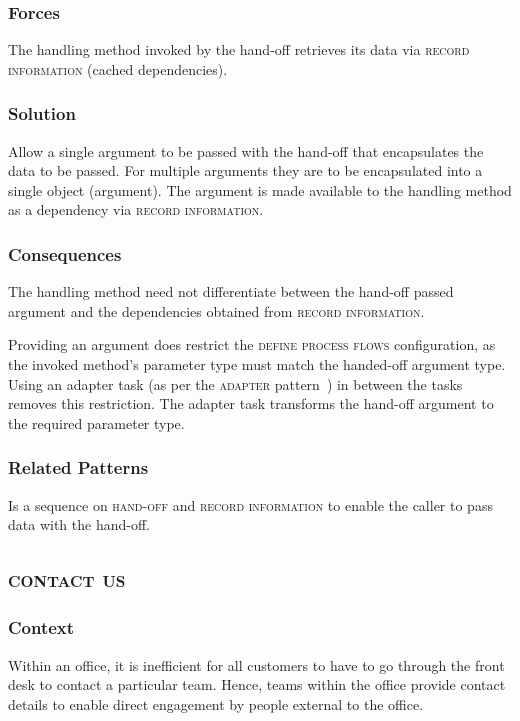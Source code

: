 \documentclass[prodmode]{style/acmlarge}
\begin{document}
\subsubsection*{Forces} The handling method invoked by the hand-off retrieves
its data via \textsc{record information} (cached dependencies).

\subsubsection*{\textbf{Solution}} Allow a single argument to be passed with the
hand-off that encapsulates the data to be passed.  For multiple arguments they
are to be encapsulated into a single object (argument).  The argument is made
available to the handling method as a dependency via \textsc{record
information}.

\subsubsection*{Consequences} The handling method need not differentiate between
the hand-off passed argument and the dependencies obtained from \textsc{record
information}.

Providing an argument does restrict the \textsc{define process flows}
configuration, as the invoked method's parameter type must match the handed-off
argument type.  Using an adapter task (as per the \textsc{adapter}
pattern~\cite{gof}) in between the tasks removes this restriction.  The adapter
task transforms the hand-off argument to the required parameter type.

\subsubsection*{Related Patterns} Is a sequence on \textsc{hand-off} and
\textsc{record information} to enable the caller to pass data with the hand-off.



\subsection{\textsc{\textbf{contact us}}}

\subsubsection*{Context} Within an office, it is inefficient for all customers
to have to go through the front desk to contact a particular team.  Hence, teams
within the office provide contact details to enable direct engagement by people
external to the office.
\end{document}

